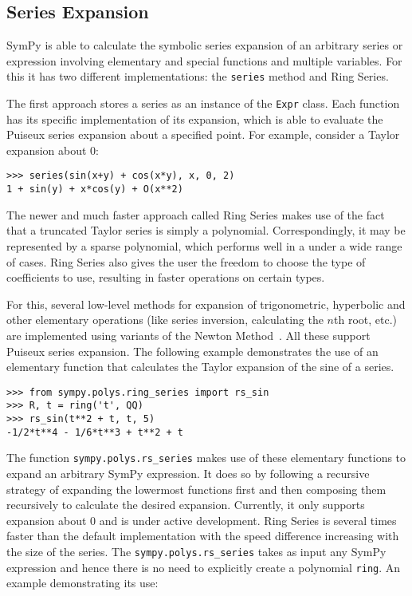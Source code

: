 \subsection{Series Expansion}

SymPy is able to calculate the symbolic series expansion of an arbitrary series
or expression involving elementary and special functions and multiple
variables. For this it has two different implementations: the \texttt{series}
method and Ring Series.

The first approach stores a series as an instance of the \texttt{Expr} class.
Each function has its specific implementation of its expansion, which is able to
evaluate the Puiseux series expansion about a specified point. For example,
consider a Taylor expansion about 0:

\begin{verbatim}
>>> series(sin(x+y) + cos(x*y), x, 0, 2)
1 + sin(y) + x*cos(y) + O(x**2)
\end{verbatim}

The newer and much faster approach called Ring Series makes use of the
fact that a truncated Taylor series is simply a polynomial. Correspondingly, it
may be represented by a sparse polynomial, which performs
well in a under a wide range of cases. Ring Series also gives
the user the freedom to choose the type of coefficients to use, resulting in
faster operations on certain types.

For this, several low-level methods for expansion of trigonometric, hyperbolic
and other elementary operations (like series inversion, calculating the $n$th
root, etc.) are implemented using variants of the Newton Method~\cite{zimmerman}.
All these support Puiseux series expansion. The following example demonstrates
the use of an elementary function that calculates the Taylor expansion of the
sine of a series.

\begin{verbatim}
>>> from sympy.polys.ring_series import rs_sin
>>> R, t = ring('t', QQ)
>>> rs_sin(t**2 + t, t, 5)
-1/2*t**4 - 1/6*t**3 + t**2 + t
\end{verbatim}

The function \texttt{sympy.polys.rs\_series} makes use of these elementary
functions to expand an arbitrary SymPy expression. It does so by following a
recursive strategy of expanding the lowermost functions first and then
composing them recursively to calculate the desired expansion. Currently, it
only supports expansion about 0 and is under active development. Ring Series
is several times faster than the default implementation with the speed
difference increasing with the size of the series. The
\texttt{sympy.polys.rs\_series} takes as input any SymPy expression and hence
there is no need to explicitly create a polynomial \texttt{ring}. An example
demonstrating its use:

